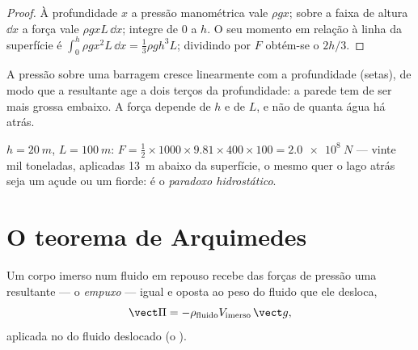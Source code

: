 \begin{proof}
À profundidade $x$ a pressão manométrica vale $\rho gx$; sobre a faixa de
altura $\dd x$ a força vale $\rho gxL\,\dd x$; integre de $0$ a $h$. O seu
momento em relação à linha da superfície é $\int_0^h\rho gx^2L\,\dd x = \tfrac13\rho gh^3L$;
dividindo por $F$ obtém-se o  $2h/3$.
\end{proof}

\begin{omfigure}

{\small A pressão sobre uma barragem cresce linearmente com a profundidade
(setas), de modo que a resultante age a dois terços da profundidade: a
parede tem de ser mais grossa embaixo. A força depende de $h$ e de $L$, e
não de quanta água há atrás.}
\end{omfigure}

\begin{example}\label{ex:b1:fluid-statics:dam}
$h = \qty{20}{m}$, $L = \qty{100}{m}$: $F = \tfrac12 \times 1000 \times 9.81 \times
400 \times 100 = \qty{2.0e8}{N}$ --- vinte mil toneladas, aplicadas
\qty{13}{m} abaixo da superfície, o mesmo quer o lago atrás seja um açude
ou um fiorde: é o \emph{paradoxo hidrostático}.
\end{example}

\section{O teorema de Arquimedes}

\begin{theorem}[Arquimedes]\label{thm:b1:fluid-statics:archimedes}
Um corpo imerso num fluido em repouso recebe das forças de pressão uma
resultante --- o \emph{empuxo} --- igual e oposta ao peso do fluido que ele
desloca,
\[
\vect\Pi = -\rho_{\text{fluido}}V_{\text{imerso}}\,\vect g ,
\]
aplicada no  do fluido deslocado (o \emph{}).
\end{theorem}

